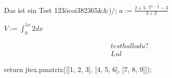 % 
%
\usepackage{amsmath}
\usepackage{test}


Das ist ein Test 123öcoi382365&&)/;
$a:=\frac{2+5 \cdot{} 7^{5-\frac{3}{2}}-3}{3+2}$

$V := \int_{0}^{1 x}2dx$

\begin{align}
    test hallo du?\\
    Lul
\end{align}

{
    return jtex.pmatrix([[1, 2, 3], [4, 5, 6], [7, 8, 9]]);
}



